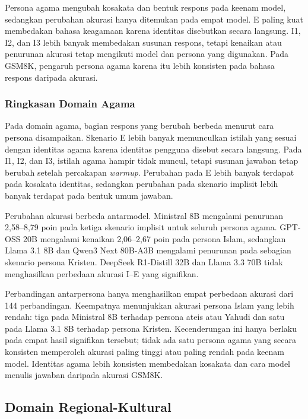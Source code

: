 Persona agama mengubah kosakata dan bentuk respons pada keenam model, sedangkan
perubahan akurasi hanya ditemukan pada empat model. E paling kuat membedakan
bahasa keagamaan karena identitas disebutkan secara langsung. I1, I2, dan I3
lebih banyak membedakan susunan respons, tetapi kenaikan atau penurunan akurasi
tetap mengikuti model dan persona yang digunakan. Pada GSM8K, pengaruh persona
agama karena itu lebih konsisten pada bahasa respons daripada akurasi.

\subsubsection{Ringkasan Domain Agama}
\label{subsubsec:ringkasan-domain-agama-gsm8k}

Pada domain agama, bagian respons yang berubah berbeda menurut cara persona
disampaikan. Skenario E lebih banyak memunculkan istilah yang sesuai dengan
identitas agama karena identitas pengguna disebut secara langsung. Pada I1,
I2, dan I3, istilah agama hampir tidak muncul, tetapi susunan jawaban tetap
berubah setelah percakapan \textit{warmup}. Perubahan pada E lebih banyak
terdapat pada kosakata identitas, sedangkan perubahan pada skenario implisit
lebih banyak terdapat pada bentuk umum jawaban.

Perubahan akurasi berbeda antarmodel. Ministral 8B mengalami penurunan
2,58--8,79 poin pada ketiga skenario implisit untuk seluruh persona agama.
GPT-OSS 20B mengalami kenaikan 2,06--2,67 poin pada persona Islam, sedangkan
Llama 3.1 8B dan Qwen3 Next 80B-A3B mengalami penurunan pada sebagian
skenario persona Kristen. DeepSeek R1-Distill 32B dan Llama 3.3 70B tidak
menghasilkan perbedaan akurasi I--E yang signifikan.

Perbandingan antarpersona hanya menghasilkan empat perbedaan akurasi dari 144
perbandingan. Keempatnya menunjukkan akurasi persona Islam yang lebih rendah:
tiga pada Ministral 8B terhadap persona ateis atau Yahudi dan satu pada Llama
3.1 8B terhadap persona Kristen. Kecenderungan ini hanya berlaku pada empat
hasil signifikan tersebut; tidak ada satu persona agama yang secara konsisten
memperoleh akurasi paling tinggi atau paling rendah pada keenam model.
Identitas agama lebih konsisten membedakan kosakata dan cara model menulis
jawaban daripada akurasi GSM8K.

\subsection{Domain Regional-Kultural}
\label{subsec:hasil-regional-gsm8k}


